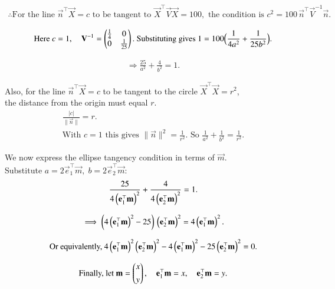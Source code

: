 \documentclass[journal]{IEEEtran}
\begin{document}
\begin{align*}
\therefore\text{For the line } \vec{n}^\top\vec{X}=c \text{ to be tangent to } 
\vec{X}^\top\vec{V}\vec{X}=100,\text{ the condition is } 
c^2 = 100\,\vec{n}^\top\vec{V}^{-1}\vec{n}.
\end{align*}

\begin{align}
\text{Here } c=1,\quad
\mathbf{V}^{-1}=\begin{pmatrix}\tfrac{1}{4} & 0 \\ 0 & \tfrac{1}{25}\end{pmatrix}.
\text{ Substituting gives }
1 = 100\Big(\frac{1}{4a^2}+\frac{1}{25b^2}\Big).
\end{align}

\begin{align}
\Rightarrow \frac{25}{a^2}+\frac{4}{b^2}=1.
\end{align}


Also, for the line $\vec{n}^\top\vec{X}=c$ to be tangent to the circle $\vec{X}^\top\vec{X}=r^2$,\\ 
the distance from the origin must equal $r$.
\begin{align}
    \frac{|c|}{\|\vec{n}\|}=r.\\
    \text{With } c=1 \text{ this gives } \|\vec{n}\|^2 = \frac{1}{r^2}.
    \text{ So }
    \frac{1}{a^2}+\frac{1}{b^2}=\frac{1}{r^2}.
\end{align}

We now express the ellipse tangency condition in terms of $\vec{m}$.\\
Substitute $a=2\vec{e}_1^\top\vec{m},\; b=2\vec{e}_2^\top\vec{m}:$
\begin{align}
\frac{25}{4\left(\mathbf{e}_1^\top\mathbf{m}\right)^2}+\frac{4}{4\left(\mathbf{e}_2^\top\mathbf{m}\right)^2}=1.
\end{align}


\begin{align}
\implies \left(4\left(\mathbf{e}_1^\top\mathbf{m}\right)^2-25\right)\,\left(\mathbf{e}_2^\top\mathbf{m}\right)^2
=4\left(\mathbf{e}_1^\top\mathbf{m}\right)^2.
\end{align}

\begin{align}
\text{Or equivalently, }
4\left(\mathbf{e}_1^\top\mathbf{m}\right)^2\left(\mathbf{e}_2^\top\mathbf{m}\right)^2
-4\left(\mathbf{e}_1^\top\mathbf{m}\right)^2
-25\left(\mathbf{e}_2^\top\mathbf{m}\right)^2
=0.
\end{align}

\begin{align}
\text{Finally, let } 
\mathbf{m}=\begin{pmatrix}x\\[4pt] y\end{pmatrix},
\quad \mathbf{e}_1^\top\mathbf{m}=x,\quad \mathbf{e}_2^\top\mathbf{m}=y.
\end{align}
\end{document}
